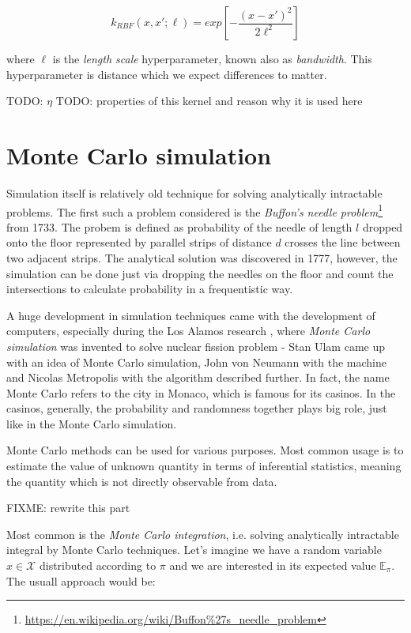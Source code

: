 \documentclass[
  digital, %
  oneside, %
  lof,     %
  lot,     %
]{fithesis4}
\begin{document}
\begin{equation}
k_{RBF} \left( x, x'; \ell \right) = exp \left[ -\frac{(x - x')^2}{2\ell^2} \right]
\end{equation}

where $\ell$ is the \textit{length scale} hyperparameter, 
known also as \textit{bandwidth}. 
This hyperparameter is distance which we expect 
differences to matter.

TODO: $\eta$
TODO: properties of this kernel and reason why it is used here


\section{Monte Carlo simulation}

Simulation itself is relatively old technique for 
solving analytically intractable problems. 
The first such a problem considered is the 
\textit{Buffon's needle problem}\footnote{\url{https://en.wikipedia.org/wiki/Buffon\%27s_needle_problem}} from 1733. 
The probem is defined as probability of the 
needle of length $l$ dropped onto the floor 
represented by parallel strips of distance 
$d$ crosses the line between two adjacent 
strips. 
The analytical solution was discovered in 1777, 
however, the simulation can be done just via 
dropping the needles on the floor and count 
the intersections to calculate probability 
in a frequentistic way.

A huge development in simulation techniques 
came with the development of computers, 
especially during the Los Alamos research 
\cite{metropolis1987}, where 
\textit{Monte Carlo simulation} was invented to 
solve nuclear fission problem - Stan Ulam 
came up with an idea of Monte Carlo simulation, 
John von Neumann with the machine and 
Nicolas Metropolis with the algorithm described 
further.
In fact, the name Monte Carlo refers to the city 
in Monaco, which is famous for its casinos. 
In the casinos, generally, the probability and 
randomness together plays big role, just like in the 
Monte Carlo simulation.

Monte Carlo methods can be used for various 
purposes. 
Most common usage is to estimate the value of 
unknown quantity in terms of inferential 
statistics, meaning the quantity which is not 
directly observable from data.

FIXME: rewrite this part

Most common is the \textit{Monte Carlo integration}, 
i.e. solving analytically intractable integral 
by Monte Carlo techniques. 
Let's imagine we have a random variable 
$x \in \mathcal{X}$ distributed according to 
$\pi$ and we are interested in its expected 
value $\mathbb{E}_{\pi}$. 
The usuall approach would be:
\end{document}

